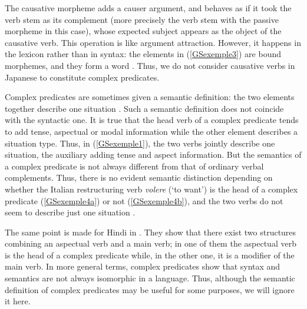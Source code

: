 \documentclass[output=paper
	        ,collection
	        ,collectionchapter
 	        ,biblatex
                ,babelshorthands
                ,newtxmath
                ,draftmode
                ,colorlinks, citecolor=brown
]{langscibook}
\begin{document}
{
\z

The causative morpheme adds a causer argument, and behaves as if it took the verb stem as its complement (more precisely the verb stem with the passive morpheme in this case), whose expected subject appears as the object of the causative verb. This operation is like argument attraction. However, it happens in the lexicon rather than in syntax: the elements in (\ref{GSexemple3}) are bound morphemes, and they form a word \citep{manning1999lexical, gunji2012topics}. Thus, we do not consider causative verbs in Japanese to constitute complex predicates.

Complex predicates are sometimes given a semantic definition: the two elements together describe one situation \citep{butt1995structure}. Such a semantic definition does not coincide with the syntactic one. It is true that the head verb of a complex predicate tends to add tense, aspectual or modal information while the other element describes a situation type. Thus, in (\ref{GSexemple1}), the two verbs jointly describe one situation, the auxiliary adding tense and aspect information. But the semantics of a complex predicate is not always different from that of ordinary verbal complements. Thus, there is no evident semantic distinction depending on whether the Italian restructuring verb \emph{volere} (`to want') is the head of a complex predicate (\ref{GSexemple4a}) or not (\ref{GSexemple4b}), and the two verbs do not seem to describe just one situation \citep[314]{Monachesi98a}.  

\eal 
	\label{GSexemple4} 
	\label{GSexemple4a}
		
	\label{GSexemple4b} 
\zl

The same point is made for Hindi in \cite{poornima2009hindi}. They show that there exist two structures combining an aspectual verb and a main verb; in one of them the aspectual verb is the head of a complex predicate while, in the other one, it is a modifier of the main verb. In more general terms, complex predicates show that syntax and semantics are not always isomorphic in a language. Thus, although the semantic definition of complex predicates may be useful for some purposes, we will ignore it here.

}
\end{document}
